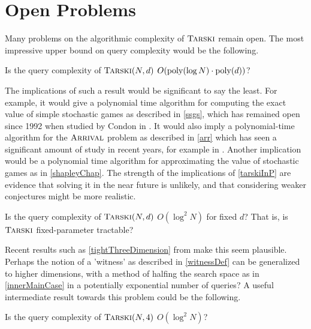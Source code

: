 \section{Open Problems}
Many problems on the algorithmic complexity of $\textsc{Tarski}$ remain 
open. The most impressive upper bound on query complexity would be the following.
\begin{open} \label{tarskiInP}
  Is the query complexity of $\textsc{Tarski}(N, d)$ $O(\mathrm{poly}(\log N) \cdot \mathrm{poly}(d))$?
\end{open}
The implications of such a result would be significant to say the least.
For example, it would give a polynomial time algorithm for
computing the exact value of simple stochastic games as described in \cref{ssgs},
which has remained open since 1992 when studied by Condon in \citep{condon}.
It would also imply a polynomial-time algorithm for the $\textsc{Arrival}$ problem as described in \cref{arr}
which has seen a significant amount of study in recent years, 
for example in \citep{gärtner2021subexponential, gärtner2018arrival, arrivalBasic}. 
Another implication would be a polynomial time algorithm for approximating the value of
stochastic games as in \cref{shapleyChap}. The strength of the implications of \cref{tarskiInP}
are evidence that solving it in the near future is unlikely, and that considering weaker conjectures
might be more realistic.
\begin{open} \label{tarskiFixedParameterTractable}
  Is the query complexity of 
  $\textsc{Tarski}(N, d)$ $O(\log^2 N)$ for fixed $d$? That is, is $\textsc{Tarski}$ fixed-parameter tractable?
\end{open}
Recent results such as \cref{tightThreeDimension} from \citep{fasterTarski} make this seem
plausible. Perhaps the notion of a 'witness' as described in \cref{witnessDef} can be
generalized to higher dimensions, with a method of halfing the search space as in \cref{innerMainCase}
in a potentially exponential number of queries? A useful intermediate result towards this problem could be
the following.
\begin{open} \label{tightFourDimension}
  Is the query complexity of $\textsc{Tarski}(N, 4)$ $O(\log^2 N)$?
\end{open}
